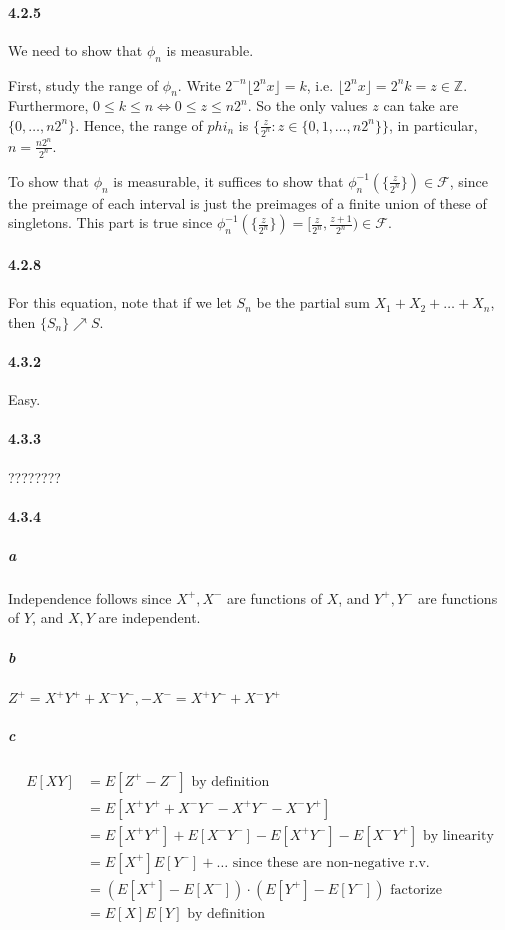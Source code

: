 \documentclass[a4paper]{article}
\newcommand{\alg}[0]{\mathcal{F}} %
\newcommand{\integer}[0]{\mathbb{Z}} %
\newcommand{\seqconn}[3]{#1_1 #3 #1_2 #3 \dots #3 #1_{#2}} %
\newcommand{\floor}[1]{\lfloor #1\rfloor}
\begin{document}
\paragraph{4.2.5} We need to show that $\phi_n$ is measurable.

First, study the range of $\phi_n$. Write $2^{-n}\floor{2^nx} = k$, i.e. $\floor{2^nx} = 2^nk = z\in\integer$. Furthermore, $0\leq k\leq n\iff 0\leq z\leq n2^n$. So the only values $z$ can take are $\{0,\dots,n2^n\}$. Hence, the range of $phi_n$ is $\{\frac{z}{2^n} : z\in \{0,1,\dots,n2^n\}\}$, in particular, $n = \frac{n2^n}{2^n}$.

To show that $\phi_n$ is measurable, it suffices to show that $\phi_n^{-1}(\{\frac{z}{2^n}\})\in \alg$, since the preimage of each interval is just the preimages of a finite union of these of singletons. This part is true since $\phi_n^{-1}(\{\frac{z}{2^n}\}) = [\frac{z}{2^n}, \frac{z+1}{2^n})\in \alg$.


\paragraph{4.2.8} For this equation, note that if we let $S_n$ be the partial sum $\seqconn{X}{n}{+}$, then $\{S_n\}\nearrow S$.

\paragraph{4.3.2} Easy.

\paragraph{4.3.3} ???????? 

\paragraph{4.3.4}
\subparagraph{a} Independence follows since $X^+,X^-$ are functions of $X$, and $Y^+,Y^-$ are functions of $Y$, and $X, Y$ are independent.
\subparagraph{b} $Z^+ = X^+Y^+ + X^-Y^-, -X^- = X^+Y^- + X^-Y^+$
\subparagraph{c} 
\begin{align*}
	E[XY] &= E[Z^+-Z^-]\text{ by definition}\\
	&= E[X^+Y^+ + X^-Y^- - X^+Y^- - X^-Y^+]\\
	&= E[X^+Y^+] + E[X^-Y^-] - E[X^+Y^-] - E[X^-Y^+]\text{ by linearity}\\
	&= E[X^+]E[Y^-] + \dots \text{ since these are non-negative r.v.}\\
	&= (E[X^+]-E[X^-])\cdot(E[Y^+]-E[Y^-])\text{ factorize}\\
	&= E[X]E[Y]\text{ by definition}
\end{align*}
\end{document}
